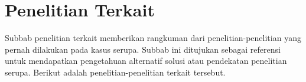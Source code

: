 \section{Penelitian Terkait}
\label{sec:penelitian-terkait}

Subbab penelitian terkait memberikan rangkuman dari penelitian-penelitian yang pernah dilakukan pada kasus serupa. Subbab ini ditujukan sebagai referensi untuk mendapatkan pengetahuan alternatif solusi atau pendekatan penelitian serupa. Berikut adalah penelitian-penelitian terkait tersebut. 



